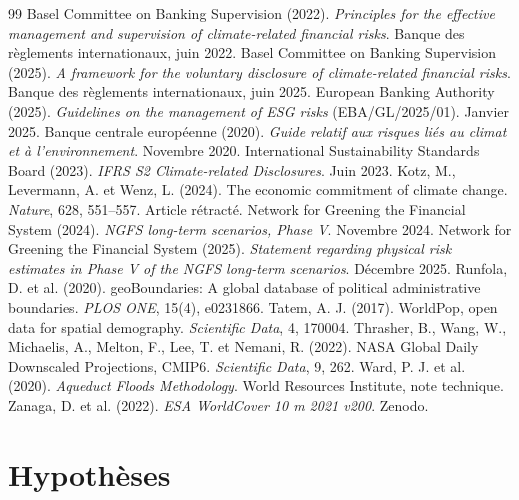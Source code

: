 \documentclass[11pt,a4paper]{article}
\begin{document}
\begin{thebibliography}{99}\small
\setlength{\itemsep}{2pt}
 Basel Committee on Banking Supervision (2022). \emph{Principles for the effective management and supervision of climate-related financial risks}. Banque des règlements internationaux, juin 2022.
 Basel Committee on Banking Supervision (2025). \emph{A framework for the voluntary disclosure of climate-related financial risks}. Banque des règlements internationaux, juin 2025.
 European Banking Authority (2025). \emph{Guidelines on the management of ESG risks} (EBA/GL/2025/01). Janvier 2025.
 Banque centrale européenne (2020). \emph{Guide relatif aux risques liés au climat et à l'environnement}. Novembre 2020.
 International Sustainability Standards Board (2023). \emph{IFRS S2 Climate-related Disclosures}. Juin 2023.
 Kotz, M., Levermann, A. et Wenz, L. (2024). The economic commitment of climate change. \emph{Nature}, 628, 551--557. Article rétracté.
 Network for Greening the Financial System (2024). \emph{NGFS long-term scenarios, Phase V}. Novembre 2024.
 Network for Greening the Financial System (2025). \emph{Statement regarding physical risk estimates in Phase V of the NGFS long-term scenarios}. Décembre 2025.
 Runfola, D. et al. (2020). geoBoundaries: A global database of political administrative boundaries. \emph{PLOS ONE}, 15(4), e0231866.
 Tatem, A. J. (2017). WorldPop, open data for spatial demography. \emph{Scientific Data}, 4, 170004.
 Thrasher, B., Wang, W., Michaelis, A., Melton, F., Lee, T. et Nemani, R. (2022). NASA Global Daily Downscaled Projections, CMIP6. \emph{Scientific Data}, 9, 262.
 Ward, P. J. et al. (2020). \emph{Aqueduct Floods Methodology}. World Resources Institute, note technique.
 Zanaga, D. et al. (2022). \emph{ESA WorldCover 10 m 2021 v200}. Zenodo.
\end{thebibliography}

\appendix
\section{Hypothèses}\label{app:hyp}
\end{document}
